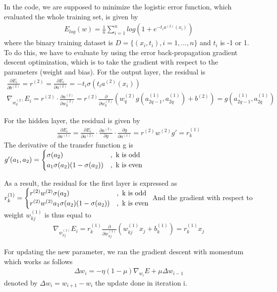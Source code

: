 \begin{enumerate}[(1)]
In the code, we are supposed to minimize the logistic error function, which evaluated the whole training set, is given by
\begin{align}
E_{log}(w)=\frac{1}{n}\sum_{i=1}^n log(1+e^{-t_i a^{(2)}(x_i)})
\end{align}
where the binary training dataset is $D=\{(x_{i},t_{i}),i=1,...,n\}$ and $t_i$ is -1 or 1.
To do this, we have to evaluate by using the error back-propagation gradient descent optimization, which is to take the gradient with respect to the parameters (weight and bias).
For the output layer, the residual is
\begin{align}
\frac{\partial E_{i}}{\partial b^{(2)}}=r^{(2)}=\frac{\partial E_{i}}{\partial a^{(2)}}=-t_{i}\sigma(t_{i}a^{(2)}(x_{i}))\\
\nabla_{w_q^{(2)}} E_{i}=r^{(2)}\cdot\frac{\partial a^{(2)}}{\partial w_{q}^{(2)}} = r^{(2)}\frac{\partial}{\partial w_{q}^{(2)}} (w_{q}^{(2)} g(a_{2q-1}^{(1)},a_{2q}^{(1)})+b^{(2)})=g(a_{2q-1}^{(1)},a_{2q}^{(1)})
\end{align}

For the hidden layer, the residual is given by
\begin{align}
\frac{\partial E_{i}}{\partial a^{(1)}}=\frac{\partial E_{i}}{\partial a^{(2)}}\cdot\frac{\partial a^{(2)}}{\partial g}\cdot\frac{\partial g}{\partial a^{(1)}} =r^{(2)}w^{(2)}g' = r_{k}^{(1)}
\end{align}
The derivative of the transfer function g is $g'(a_1,a_2)=
\begin{cases}
\sigma(a_2)&,  \text{  k is odd}\cr a_1 \sigma(a_2)(1-\sigma(a_2))&,  \text{  k is even}
\end{cases}$

As a result, the residual for the first layer is expressed as $r_{k}^{(1)}=
\begin{cases}
r^{(2)}w^{(2)}\sigma(a_2)&,  \text{  k is odd}\cr r^{(2)}w^{(2)}a_1 \sigma(a_2)(1-\sigma(a_2))&,  \text{  k is even}
\end{cases}$
And the gradient with respect to weight $w_{kj}^{(1)}$ is thus equal to
\begin{align}
\nabla_{w_{kj}^{(1)}} E_{i}=r_k^{(1)}\frac{\partial}{\partial w_{kj}^{(1)}}(w_{kj}^{(1)} x_{j}+b_{k}^{(1)})=r_{k}^{(1)}x_{j}
\end{align}

For updating the new parameter, we ran the gradient descent with momentum which works as follows
\begin{align}
\Delta w_i=-\eta(1-\mu)\nabla_{w_i}E+\mu\Delta w_{i-1}
\end{align}
denoted by $\Delta w_i=w_{i+1}-w_i$ the update done in iteration i.


\end{enumerate}
